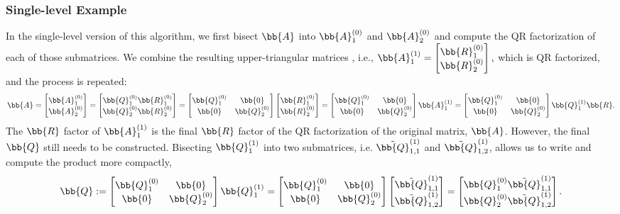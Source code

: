 		\subsubsection{Single-level Example}
		\label{Qdetails}
		In the single-level version of this algorithm, we first bisect $\bb{A}$  into $\bb{A}_1^{(0)}$ and $\bb{A}_2^{(0)}$ and compute the QR factorization of each of those submatrices.
		We combine the resulting upper-triangular matrices , i.e.,  \(\bb{A}_{1}^{(1)} =\begin{bmatrix}
		\bb{R}_{1}^{(0)}\\ 
		\bb{R}_{2}^{(0)} 
		\end{bmatrix},\)   which is QR factorized, and the process is repeated:
		\[
		\bb{A} = \begin{bmatrix}
		\bb{A}_1^{(0)}\\
		\bb{A}_2^{(0)}
		\end{bmatrix} = \begin{bmatrix}
		\bb{Q}_1^{(0)}\bb{R}_1^{(0)}\\
		\bb{Q}_2^{(0)}\bb{R}_2^{(0)}
		\end{bmatrix} = \begin{bmatrix}
		\bb{Q}_1^{(0)} & \bb{0}\\
		\bb{0} & \bb{Q}_2^{(0)}
		\end{bmatrix} \begin{bmatrix}
		\bb{R}_1^{(0)} \\
		\bb{R}_2^{(0)}
		\end{bmatrix} =\begin{bmatrix}
		\bb{Q}_1^{(0)} & \bb{0}\\
		\bb{0} & \bb{Q}_2^{(0)}
		\end{bmatrix} \bb{A}_1^{(1)} =\begin{bmatrix}
		\bb{Q}_1^{(0)} & \bb{0}\\
		\bb{0} & \bb{Q}_2^{(0)}
		\end{bmatrix} \bb{Q}_1^{(1)}\bb{R}.%
		\] 
		The $\bb{R}$ factor of $\bb{A}_1^{(1)}$ is the final $\bb{R}$ factor of the QR factorization of the original matrix, $\bb{A}$. 
		However, the final $\bb{Q}$ still needs to be constructed.
		Bisecting  $\bb{Q}_1^{(1)}$ into two submatrices, i.e. $\tilde{\bb{Q}}_{1,1}^{(1)}$ and $\tilde{\bb{Q}}_{1,2}^{(1)}$, allows us to write and compute the product more compactly,  \[
	    \bb{Q}:=\begin{bmatrix}
		\bb{Q}_1^{(0)} & \bb{0}\\
		\bb{0} & \bb{Q}_2^{(0)}
		\end{bmatrix} \bb{Q}_1^{(1)} =    \begin{bmatrix}
		\bb{Q}_1^{(0)} & \bb{0}\\
		\bb{0} & \bb{Q}_2^{(0)}
		\end{bmatrix} \begin{bmatrix}
		\tilde{\bb{Q}}_{1,1}^{(1)}\\
		\tilde{\bb{Q}}_{1,2}^{(1)}
		\end{bmatrix}= \begin{bmatrix}
		\bb{Q}_1^{(0)}\tilde{\bb{Q}}_{1,1}^{(1)} \\ 
		\bb{Q}_2^{(0)}\tilde{\bb{Q}}_{1,2}^{(1)}
		\end{bmatrix}. \]
